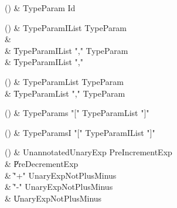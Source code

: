 \begin{bbgrammarappendix}

() & TypeParam \label{prod:TypeParam}  \: Id  \\


\end{bbgrammarappendix}

\begin{bbgrammarappendix}

() & TypeParamIList \label{prod:TypeParamIList}  \: TypeParam  \\

 &    \|  \\
 &    \| TypeParamIList \xcd"," TypeParam \\
 &    \| TypeParamIList \xcd"," \\

\end{bbgrammarappendix}

\begin{bbgrammarappendix}

() & TypeParamList \label{prod:TypeParamList}  \: TypeParam  \\

 &    \| TypeParamList \xcd"," TypeParam \\

\end{bbgrammarappendix}

\begin{bbgrammarappendix}

() & TypeParams \label{prod:TypeParams}  \: \xcd"[" TypeParamList \xcd"]"  \\


\end{bbgrammarappendix}

\begin{bbgrammarappendix}

() & TypeParamsI \label{prod:TypeParamsI}  \: \xcd"[" TypeParamIList \xcd"]"  \\


\end{bbgrammarappendix}

\begin{bbgrammarappendix}

() & UnannotatedUnaryExp \label{prod:UnannotatedUnaryExp}  \: PreIncrementExp  \\

 &    \| PreDecrementExp \\
 &    \| \xcd"+" UnaryExpNotPlusMinus \\
 &    \| \xcd"-" UnaryExpNotPlusMinus \\
 &    \| UnaryExpNotPlusMinus \\

\end{bbgrammarappendix}

